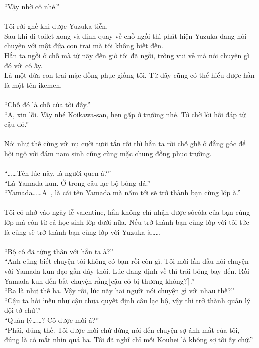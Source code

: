 \documentclass[12pt,a4paper, twosides]{book}
\begin{document}
“Vậy nhờ cô nhé.”\\
\\
Tôi rời ghế khi được Yuzuka tiễn.\\
Sau khi đi toilet xong và định quay về chỗ ngồi thì phát hiện Yuzuka đang nói chuyện với một đứa con trai mà tôi không biết đến.\\
Hắn ta ngồi ở chỗ mà từ nãy đến giờ tôi đã ngồi, trông vui vẻ mà nói chuyện gì đó với cô ấy.\\
Là một đứa con trai mặc đồng phục giống tôi. Từ đây cũng có thể hiểu được hắn là một tên ikemen.\\
\\
“Chỗ đó là chỗ của tôi đấy.”\\
“A, xin lỗi. Vậy nhé Koikawa-san, hẹn gặp ở trường nhé. Tớ chờ lời hồi đáp từ cậu đó.”\\
\\
Nói như thế cùng với nụ cười tươi tắn rồi thì hắn ta rời chỗ ghế ở đằng góc để hội ngộ với đám nam sinh cũng cùng mặc chung đồng phục trường.\\
\\
“……Tên lúc nãy, là người quen à?”\\
“Là Yamada-kun. Ở trong câu lạc bộ bóng đá.”\\
“Yamada……A~, là cái tên Yamada mà năm tới sẽ trở thành bạn cùng lớp à.”\\
\\
Tôi có nhớ vào ngày lễ valentine, hắn không chỉ nhận được sôcôla của bạn cùng lớp mà còn từ cả học sinh lớp dưới nữa. Nếu trở thành bạn cùng lớp với tôi tức là cũng sẽ trở thành bạn cùng lớp với Yuzuka à……\\
\\
“Bộ cô đã từng thân với hắn ta à?”\\
“Anh cũng biết chuyện tôi không có bạn rồi còn gì. Tôi mới lần đầu nói chuyện với Yamada-kun dạo gần đây thôi. Lúc đang định về thì trái bóng bay đến. Rồi Yamada-kun đến bắt chuyện rằng$\lfloor$cậu có bị thương không?$\rceil$.”\\
“Ra là như thế ha. Vậy rồi, lúc nãy hai người nói chuyện gì với nhau thế?”\\
“Cậu ta hỏi ‘nếu như cậu chưa quyết định câu lạc bộ, vậy thì trở thành quản lý đội tớ chứ’.”\\
“Quản lý……? Cô được mời á?”\\
“Phải, đúng thế. Tôi được mời chứ đừng nói đến chuyện sợ ánh mắt của tôi, đúng là có mắt nhìn quá ha. Tôi đã nghĩ chỉ mỗi Kouhei là không sợ tôi ấy chứ.”\\
\end{document}
